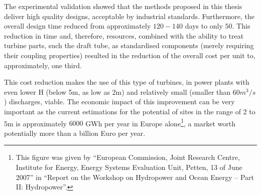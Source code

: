 The experimental validation showed that the methods proposed in this thesis deliver high quality designs, acceptable by industrial standards. Furthermore, the overall design time reduced from approximately $120-140$ days to only $50$. This reduction in time and, therefore, resources, combined with the ability to treat turbine parts, such the draft tube, as standardised components (merely requiring  their coupling properties) resulted in the reduction of the overall cost per unit to, approximately,  one third.

This cost reduction makes the use of this type of turbines, in power plants with even lower H (below 5m, as low as 2m)  and relatively small (smaller than $60m^3/s$) discharges, viable. The economic impact of this improvement can be very important as the current estimations for the potential of sites in the range of 2 to 5m is approximately $6000$ GWh
per year in Europe alone\footnote{This figure was given by ``European Commission, Joint Research Centre, Institute for Energy, Energy Systems Evaluation Unit,  Petten, 13 of June 2007'' in  ``Report on the Workshop on Hydropower and Ocean Energy – Part II: Hydropower''.}, a market worth potentially more than a billion Euro per year. 

  

 





 







 







